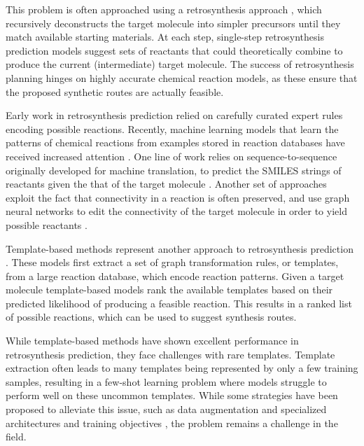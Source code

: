 This problem is often approached using a retrosynthesis approach
\citep{coreyComputerAssistedDesignComplex1969,coreyLogicChemicalSynthesis1991a}, which
recursively deconstructs the target molecule into simpler precursors until they match available
starting materials. At each step, single-step retrosynthesis prediction models suggest sets of
reactants that could theoretically combine to produce the current (intermediate) target molecule.
The success of retrosynthesis planning hinges on highly accurate chemical reaction models, as these
ensure that the proposed synthetic routes are actually feasible.

Early work in retrosynthesis prediction relied on carefully curated expert rules  encoding
possible reactions. Recently, machine learning models that learn the patterns of chemical reactions
from examples stored in reaction databases have received increased attention
\citep{coleyMachineLearningComputerAided2018}. One line of work relies on sequence-to-sequence
originally developed for machine translation, to predict the SMILES strings of reactants given the
that of the target molecule
\citep{schwallerMolecularTransformerModel2019,namLinkingNeuralMachine2016,schwallerFoundTranslationPredicting2018,karpovTransformerModelRetrosynthesis2019,tetkoStateoftheartAugmentedNLP2020}.
Another set of approaches exploit the fact that connectivity in a reaction is often preserved, and
use graph neural networks to edit the connectivity of the target molecule in order to yield possible
reactants \citep{sachaMoleculeEditGraph2020,shiGraphGraphsFramework2020,somnathLearningGraphModels2020,yanRetroXpertDecomposeRetrosynthesis2020}.

Template-based methods represent another approach to retrosynthesis prediction
\citep{seglerNeuralSymbolicMachineLearning2017,seglerPlanningChemicalSyntheses2018,daiRetrosynthesisPredictionConditional2020,sunEnergybasedViewRetrosynthesis2020}.
These models first extract a set of graph transformation rules, or templates, from a large reaction
database, which encode reaction patterns. Given a target molecule template-based models rank the
available templates based on their predicted likelihood of producing a feasible reaction.
This results in a ranked list of possible reactions, which can be used to suggest synthesis routes.

While template-based methods have shown excellent performance in retrosynthesis prediction, they
face challenges with rare templates. Template extraction often leads to many templates being
represented by only a few training samples, resulting in a few-shot learning problem where models
struggle to perform well on these uncommon templates. While some strategies have been proposed
to alleviate this issue, such as data augmentation \citep{fortunatoDataAugmentationPretraining2020}
and specialized architectures and training objectives
\citep{daiRetrosynthesisPredictionConditional2020}, the problem remains a challenge in the field.

